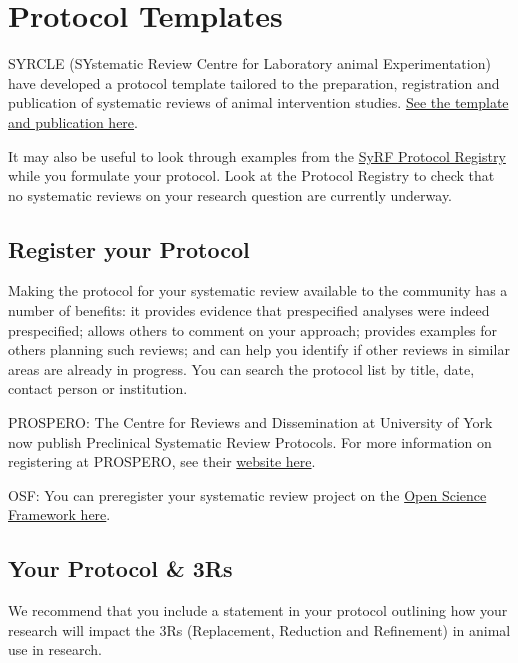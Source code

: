 \documentclass[
]{book}
\begin{document}
\hypertarget{protocol-templates}{%
\section{Protocol Templates}\label{protocol-templates}}

SYRCLE (SYstematic Review Centre for Laboratory animal Experimentation) have developed a protocol template tailored to the preparation, registration and publication of systematic reviews of animal intervention studies. \href{https://onlinelibrary.wiley.com/doi/epdf/10.1002/ebm2.7}{See the template and publication here}.

It may also be useful to look through examples from the \href{http://syrf.org.uk/protocols/}{SyRF Protocol Registry} while you formulate your protocol. Look at the Protocol Registry to check that no systematic reviews on your research question are currently underway.

\hypertarget{register-your-protocol}{%
\subsection{Register your Protocol}\label{register-your-protocol}}

Making the protocol for your systematic review available to the community has a number of benefits: it provides evidence that prespecified analyses were indeed prespecified; allows others to comment on your approach; provides examples for others planning such reviews; and can help you identify if other reviews in similar areas are already in progress. You can search the protocol list by title, date, contact person or institution.

PROSPERO:
The Centre for Reviews and Dissemination at University of York now publish Preclinical Systematic Review Protocols.
For more information on registering at PROSPERO, see their \href{https://www.crd.york.ac.uk/prospero/}{website here}.

OSF:
You can preregister your systematic review project on the \href{https://osf.io/prereg/}{Open Science Framework here}.

\hypertarget{your-protocol-3rs}{%
\subsection{Your Protocol \& 3Rs}\label{your-protocol-3rs}}

We recommend that you include a statement in your protocol outlining how your research will impact the 3Rs (Replacement, Reduction and Refinement) in animal use in research.
\end{document}
